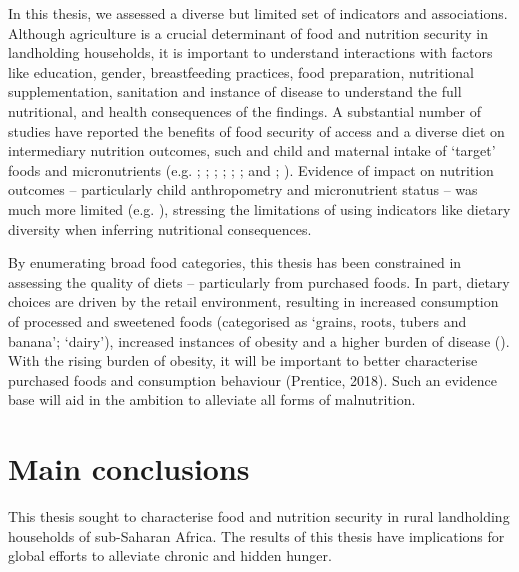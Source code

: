 In this thesis, we assessed a diverse but limited set of indicators and associations. Although agriculture is a crucial determinant of food and nutrition security in landholding households, it is important to understand interactions with factors like education, gender, breastfeeding practices, food preparation, nutritional supplementation, sanitation and instance of disease to understand the full nutritional, and health consequences of the findings. A substantial number of studies have reported the benefits of food security of access and a diverse diet on intermediary nutrition outcomes, such and child and maternal intake of `target' foods and micronutrients (e.g. \citealp{Some2018}; \citealp{Bellon2016}; \citealp{Koppmair2017325}; \citealp{Luckett20152479}; \citealp{Sibhatu201510657}; \citealp{Snapp2015}; and \citealp{Dillon2014}; \citealp{Siegel2014}). Evidence of impact on nutrition outcomes -- particularly child anthropometry and micronutrient status -- was much more limited (e.g. \citealp{Headey2018, Gillespie2017, Rah2010, Saha2009}), stressing the limitations of using indicators like dietary diversity when inferring nutritional consequences.

By enumerating broad food categories, this thesis has been constrained in assessing the quality of diets -- particularly from purchased foods. In part, dietary choices are driven by the retail environment, resulting in increased consumption of processed and sweetened foods (categorised as `grains, roots, tubers and banana'; `dairy'), increased instances of obesity and a higher burden of disease (\citealp{Demmler2018, GBD2016RiskFactorsCollaborators2017, Popkin2014}). With the rising burden of obesity, it will be important to better characterise purchased foods and consumption behaviour (Prentice, 2018). Such an evidence base will aid in the ambition to alleviate all forms of malnutrition.

\newpage
\section{Main conclusions}
This thesis sought to characterise food and nutrition security in rural landholding households of sub-Saharan Africa. The results of this thesis have implications for global efforts to alleviate chronic and hidden hunger.

